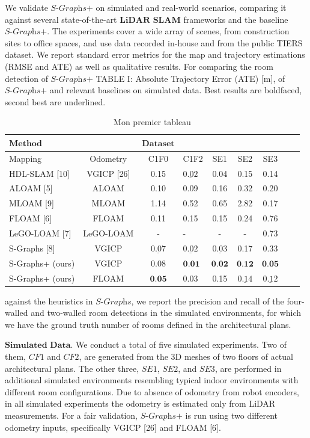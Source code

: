 \documentclass[10pt, letterpaper]{article}
\begin{document}
\begin{multicols*}{2}
 We validate $\textit{S-Graphs+}$ on simulated and real-world scenarios, comparing it against several state-of-the-art $\textbf{LiDAR SLAM}$ frameworks and the baseline $\textit{S-Graphs+}$. The experiments cover
a wide array of scenes, from construction sites to office spaces,
and use data recorded in-house and from the public TIERS
dataset. We report standard error metrics for the map and
trajectory estimations (RMSE and ATE) as well as qualitative
results. For comparing the room detection of $\textit{S-Graphs+}$ TABLE I: Absolute Trajectory Error (ATE) [m], of $\textit{S-Graphs+}$
and relevant baselines on simulated data. Best results are
boldfaced, second best are underlined.
\begin{table}[H] %
    \centering
    \begin{tabular}{l|c|clccccc} %
    \hline
     $\textbf{Method}$ && $\textbf{Dataset}$\\
     \hline
     Mapping & Odometry & C1F0 & C1F2 & SE1 & SE2 & SE3 \\
     \hline
     HDL-SLAM [10] & VGICP [26] & 0.15 & $\underline{0.02}$ & 0.04 & 0.15 & 0.14 \\
     ALOAM [5] &ALOAM  & 0.10 & 0.09 & 0.16 & 0.32 & 0.20 \\
     MLOAM [9] &MLOAM  & 1.14 & 0.52 & 0.65 & 2.82 & 0.17 \\
     FLOAM [6] &FLOAM  & 0.11 & 0.15 & 0.15 & 0.24 & 0.76 \\
     LeGO-LOAM [7] & LeGO-LOAM & -&  -&  - & - & 0.73 \\
     S-Graphs [8]&  VGICP&  $\underline{0.07}$&  $\underline{0.02}$&  $\underline{0.03}$ & 0.17&  0.33 \\
     \hline
     S-Graphs+ (ours) & VGICP & 0.08 &  $\textbf{0.01}$&  $\textbf{0.02}$ & $\textbf{0.12}$ & $\textbf{0.05}$\\
     S-Graphs+ (ours) & FLOAM & $\textbf{0.05}$ &  0.03 & 0.15&  $\underline{0.14}$ & $\underline{0.12}$\\
     \hline

    \end{tabular}
    \caption{Mon premier tableau}
    \label{tab:my_1table}
\end{table}
against the heuristics in $\textit{S-Graphs}$, we report the precision and
recall of the four-walled and two-walled room detections in the
simulated environments, for which we have the ground truth
number of rooms defined in the architectural plans.

$\textbf{Simulated Data.}$ We conduct a total of five simulated
experiments. Two of them, $\textit{CF1}$ and $\textit{CF2}$, are generated from
the 3D meshes of two floors of actual architectural plans. The
other three, $\textit{SE1}$, $\textit{SE2}$, and $\textit{SE3}$, are performed in additional
simulated environments resembling typical indoor environments with different room configurations. Due to absence of
odometry from robot encoders, in all simulated experiments
the odometry is estimated only from LiDAR measurements.
For a fair validation, $\textit{S-Graphs+}$ is run using two different
odometry inputs, specifically VGICP [26] and FLOAM [6].


\end{multicols*}
\end{document}

